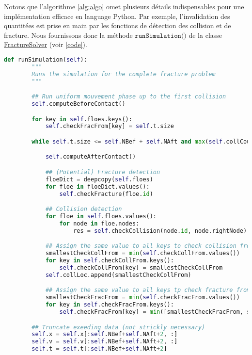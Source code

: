 Notons que l'algorithme \cref{alg:algo} omet plusieurs détails indispensables pour une implémentation efficace en language Python. Par exemple, l'invalidation des quantitées est prise en main par les fonctions de détection des collision et de fracture. Nous fournissons donc la méthode $\texttt{runSimulation()}$ de la classe \href{https://github.com/desmond-rn/ice-floes/blob/master/code/simu1D/FractureSolver.py}{FractureSolver} (voir \cref{code}).

\begin{lstlisting}[language=Python,breaklines,caption={Code de simulation 1D.},captionpos=b,label={code}]
    def runSimulation(self):
        """
        Runs the simulation for the complete fracture problem
        """

        ## Run uniform mouvement phase up to the first collision
        self.computeBeforeContact()

        for key in self.floes.keys():
            self.checkFracFrom[key] = self.t.size

        while self.t.size <= self.NBef + self.NAft and max(self.collCount.values()) < 1000:

            self.computeAfterContact()

            ## (Potential) Fracture detection 
            floeDict = deepcopy(self.floes)
            for floe in floeDict.values():
                self.checkFracture(floe.id)

            ## Collision detection 
            for floe in self.floes.values():
                for node in floe.nodes:
                    res = self.checkCollision(node.id, node.rightNode)

            ## Assign the same value to all keys to check collision from now on
            smallestCheckCollFrom = min(self.checkCollFrom.values())
            for key in self.checkCollFrom.keys():
                self.checkCollFrom[key] = smallestCheckCollFrom
            self.collLoc.append(smallestCheckCollFrom)

            ## Assign the same value to all keys tp check fracture from now on
            smallestCheckFracFrom = min(self.checkFracFrom.values())
            for key in self.checkFracFrom.keys():
                self.checkFracFrom[key] = min([smallestCheckFracFrom, smallestCheckCollFrom])

        ## Truncate exeeding data (not strickly necessary)  
        self.x = self.x[:self.NBef+self.NAft+2, :]
        self.v = self.v[:self.NBef+self.NAft+2, :]
        self.t = self.t[:self.NBef+self.NAft+2]
\end{lstlisting}

